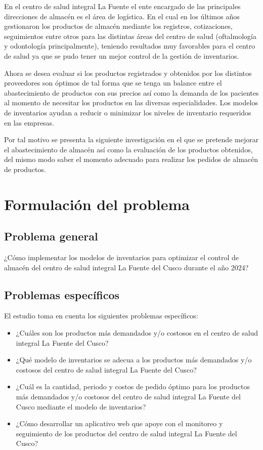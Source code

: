 En el centro de salud integral La Fuente el ente encargado de las principales direcciones de almacén es el área de logística. En el cual en los últimos años gestionaron los productos de almacén mediante los registros, cotizaciones, seguimientos entre otros para las distintas áreas del centro de salud (oftalmología y odontología principalmente), teniendo resultados muy favorables para el centro de salud ya que se pudo tener un mejor control de la gestión de inventarios.

Ahora se desea evaluar si los productos registrados y obtenidos por los distintos proveedores son óptimos de tal forma que se tenga un balance entre el abastecimiento de productos con sus precios así como la demanda de los pacientes al momento de necesitar los productos en las diversas especialidades. Los modelos de inventarios ayudan a reducir o minimizar los niveles de inventario requeridos en las empresas.

Por tal motivo se presenta la siguiente investigación en el que se pretende mejorar el abastecimiento de almacén así como la evaluación de los productos obtenidos, del mismo modo saber el momento adecuado para realizar los pedidos de almacén de productos.

\section{Formulación del problema}
\subsection{Problema general}
¿Cómo implementar los modelos de inventarios para optimizar el control de almacén del centro de salud integral La Fuente del Cusco durante el año 2024?

\subsection{Problemas específicos}
El estudio toma en cuenta los siguientes problemas específicos:

\begin{itemize}
	\item ¿Cuáles son los productos más demandados y/o costosos en el centro de salud integral La Fuente del Cusco?
	\item ¿Qué modelo de inventarios se adecua a los productos más demandados y/o costosos del centro de salud integral La Fuente del Cusco?
	\item ¿Cuál es la cantidad, periodo y costos de pedido óptimo para los productos más demandados y/o costosos del centro de salud integral La Fuente del Cusco mediante el modelo de inventarios?
	\item ¿Cómo desarrollar un aplicativo web que apoye con el monitoreo y seguimiento de los productos del centro de salud integral La Fuente del Cusco?
\end{itemize}

